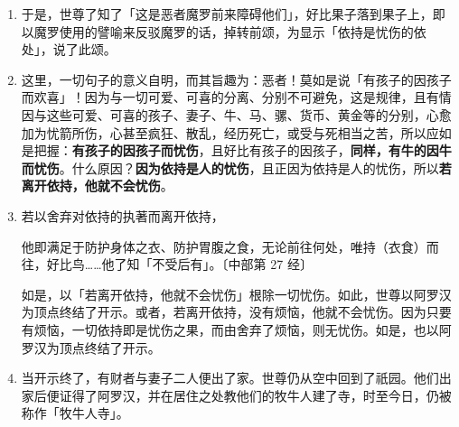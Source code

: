 \begin{enumerate}\item 于是，世尊了知了「这是恶者魔罗前来障碍他们」，好比果子落到果子上，即以魔罗使用的譬喻来反驳魔罗的话，掉转前颂，为显示「依持是忧伤的依处」，说了此颂。
\item 这里，一切句子的意义自明，而其旨趣为：恶者！莫如是说「有孩子的因孩子而欢喜」！因为与一切可爱、可喜的分离、分别不可避免，这是规律，且有情因与这些可爱、可喜的孩子、妻子、牛、马、骡、货币、黄金等的分别，心愈加为忧箭所伤，心甚至疯狂、散乱，经历死亡，或受与死相当之苦，所以应如是把握：\textbf{有孩子的因孩子而忧伤}，且好比有孩子的因孩子，\textbf{同样，有牛的因牛而忧伤}。什么原因？\textbf{因为依持是人的忧伤}，且正因为依持是人的忧伤，所以\textbf{若离开依持，他就不会忧伤}。
\item 若以舍弃对依持的执著而离开依持，\begin{quoting}他即满足于防护身体之衣、防护胃腹之食，无论前往何处，唯持（衣食）而往，好比鸟……他了知「不受后有」。{\bluefootnotesize 〔中部第 27 经〕}\end{quoting}如是，以「若离开依持，他就不会忧伤」根除一切忧伤。如此，世尊以阿罗汉为顶点终结了开示。或者，若离开依持，没有烦恼，他就不会忧伤。因为只要有烦恼，一切依持即是忧伤之果，而由舍弃了烦恼，则无忧伤。如是，也以阿罗汉为顶点终结了开示。
\item 当开示终了，有财者与妻子二人便出了家。世尊仍从空中回到了祇园。他们出家后便证得了阿罗汉，并在居住之处教他们的牧牛人建了寺，时至今日，仍被称作「牧牛人寺」。\end{enumerate}

